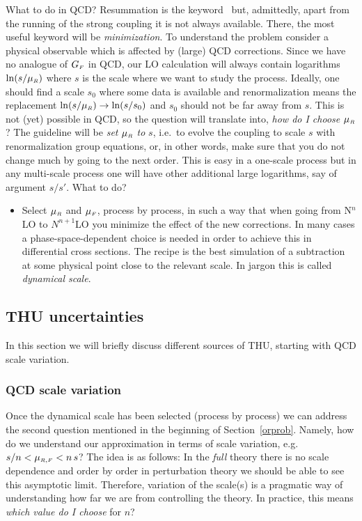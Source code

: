 What to do in QCD? Resummation is the keyword~\cite{Catani:2003zt} but, 
admittedly, apart from the running of the strong coupling it is not
always available. There, the most useful keyword will be 
{\em minimization}. To understand the problem consider a physical
observable which is affected by (large) QCD corrections. Since we have
no analogue of $G_{{\scriptscriptstyle{F}}}$ in QCD, our LO calculation will always contain logarithms
$\ln(s/\mu_{{\scriptscriptstyle{R}}})$ where $s$ is the scale where we want to study the process. 
Ideally, one should find a scale $s_0$ where some data is available and 
renormalization means the replacement
$\ln(s/\mu_{{\scriptscriptstyle{R}}}) \to \ln(s/s_0)$
and $s_0$ should not be far away from $s$. This is not (yet) possible in 
QCD, so the question will translate into, {\em how do I choose} 
$\mu_{{\scriptscriptstyle{R}}}$? The guideline will be {\em set} $\mu_{{\scriptscriptstyle{R}}}$ {\em to} $s$,
i.e.\ to evolve the coupling to scale $s$ with renormalization
group equations, or,
in other words, make sure that you do not change much by going to the
next order. This is easy in a one-scale process but in any multi-scale
process one will have other additional large logarithms, say of
argument $s/s'$. What to do?
\begin{itemize}
\item Select $\mu_{{\scriptscriptstyle{R}}}$ and $\mu_{{\scriptscriptstyle{F}}}$, process by process, in such 
a way that when going from N${}^n$LO to $N^{n+1}$LO you minimize the
effect of the new corrections. 
In many cases a phase-space-dependent choice is needed in order to
achieve this in differential cross sections.
The recipe is the best simulation of a
subtraction at some physical point close to the relevant scale. In
jargon this is called {\em dynamical scale}.
\end{itemize}
\subsection{THU uncertainties}
In this section we will briefly discuss different sources of THU, starting with
QCD scale variation.
\subsubsection{QCD scale variation \label{scale}}
Once the dynamical scale has been selected (process by process) we can
address the second question mentioned in the beginning of
Section~\ref{orprob}. Namely,
how do we understand our approximation in terms of
scale variation, e.g.\ $s/n < \mu_{{\scriptscriptstyle{R}},{\scriptscriptstyle{F}}} < n\,s$? The idea is as
follows: In the {\em full} theory there is no scale dependence
and order by order in perturbation theory we should be able to see this
asymptotic limit. Therefore, variation of the scale(s) is a pragmatic
way of understanding how far we are from controlling the theory. In
practice, this means {\em which value do I choose} for $n$?

